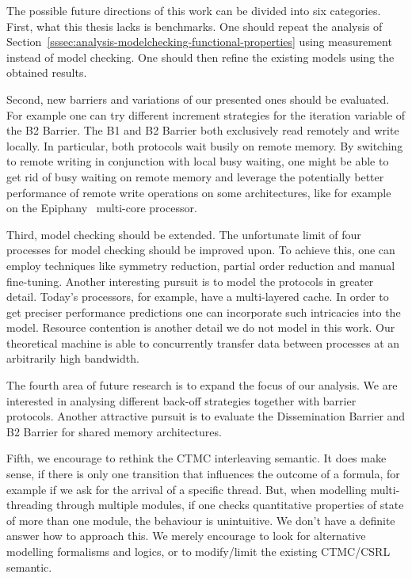 \documentclass[a4paper, 10pt]{article}
\begin{document}
The possible future directions of this work can be divided into six categories.
First, what this thesis lacks is benchmarks.
One should repeat the analysis of Section~\ref{sssec:analysis-modelchecking-functional-properties} using measurement instead of model checking. One should then refine the existing models using the obtained results.

Second, new barriers and variations of our presented ones should be evaluated.
For example one can try different increment strategies for the iteration variable of the B2 Barrier.
The B1 and B2 Barrier both exclusively read remotely and write locally. In particular, both protocols wait busily on remote memory.
By switching to remote writing in conjunction with local busy waiting, one might be able to get rid of busy waiting on remote memory and leverage the potentially better performance of remote write operations on some architectures, like for example on the Epiphany~\cite{epiphany} multi-core processor.

Third, model checking should be extended. The unfortunate limit of four processes for model checking should be improved upon. To achieve this, one can employ techniques like symmetry reduction, partial order reduction and manual fine-tuning.
Another interesting pursuit is to model the protocols in greater detail. Today's processors, for example, have a multi-layered cache. In order to get preciser performance predictions one can incorporate such intricacies into the model.
Resource contention is another detail we do not model in this work. Our theoretical machine is able to concurrently transfer data between processes at an arbitrarily high bandwidth.

The fourth area of future research is to expand the focus of our analysis. We are interested in analysing different back-off strategies together with barrier protocols. Another attractive pursuit is to evaluate the Dissemination Barrier and B2 Barrier for shared memory architectures.

Fifth, we encourage to rethink the CTMC interleaving semantic. It does make sense, if there is only one transition that influences the outcome of a formula, for example if we ask for the arrival of a specific thread. But, when modelling multi-threading through multiple modules, if one checks quantitative properties of state of more than one module, the behaviour is unintuitive. We don't have a definite answer how to approach this. We merely encourage to look for alternative modelling formalisms and logics, or to modify/limit the existing CTMC/CSRL semantic.
\end{document}

